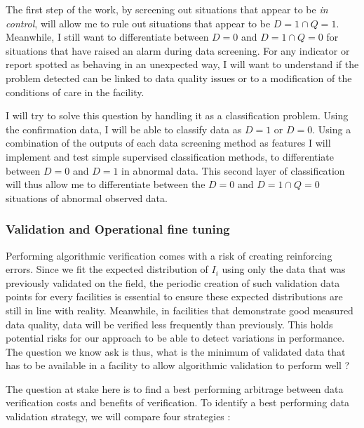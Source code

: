 The first step of the work, by screening out situations that appear to be \textit{in control}, will allow me to rule out situations that appear to be $D = 1 \cap Q = 1$. Meanwhile, I still want to differentiate between $D = 0$ and $D = 1 \cap Q = 0$ for situations that have raised an alarm during data screening. For any indicator or report spotted as behaving in an unexpected way, I will want to understand if the problem detected can be linked to data quality issues or to a modification of the conditions of care in the facility.

I will try to solve this question by handling it as a classification problem. Using the confirmation data, I will be able to classify data as $D = 1$ or $D = 0$. Using a combination of the outputs of each data screening method  as features I will implement and test simple supervised classification methods, to differentiate between $D = 0$ and $D = 1$ in abnormal data. This second layer of classification will thus allow me to differentiate between the $D = 0$ and $D = 1 \cap Q = 0$  situations of abnormal observed data.

\subsubsection{Validation and Operational fine tuning}

Performing algorithmic verification comes with a risk of creating reinforcing errors. Since we fit the expected distribution of $I_i$ using only the data that was previously validated on the field, the periodic creation of such validation data points for every facilities is essential to ensure these expected distributions are still in line with reality. Meanwhile, in facilities that demonstrate good measured data quality, data will be verified less frequently than previously. This holds potential risks for our approach to be able to detect variations in performance. The question we know ask is thus, what is the minimum of validated data that has to be available in a facility to allow algorithmic validation to perform well ?

The question at stake here is to find a best performing arbitrage between data verification costs and benefits of verification. To identify a best performing data validation strategy, we will compare four strategies :


